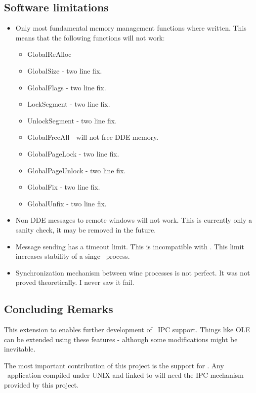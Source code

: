 \subsection{Software limitations}
\begin{itemize}
  \item Only most fundamental memory management functions where
    written. This means that the following functions will not work:
    \begin{itemize}
      \item GlobalReAlloc
      \item GlobalSize - two line fix.
      \item GlobalFlags - two line fix.
      \item LockSegment - two line fix.
      \item UnlockSegment - two line fix.
      \item GlobalFreeAll - will not free DDE memory.
      \item GlobalPageLock - two line fix.
      \item GlobalPageUnlock - two line fix.
      \item GlobalFix - two line fix.
      \item GlobalUnfix - two line fix.
    \end{itemize}
  \item Non DDE messages to remote windows will not work. This is
    currently only a sanity check, it may be removed in the future.
  \item Message sending has a timeout limit. This is incompatible with
    \windoz. This limit increases stability of a singe \Wine\ process.
  \item Synchronization mechanism between wine processes is not
    perfect. It was not proved theoretically. I never saw it fail.
\end{itemize}

\subsection{Concluding Remarks}
This extension to \Wine{} enables further development of \windoz\ IPC
support. Things like OLE can be extended using these features -
although some modifications might be inevitable.

The most important contribution of this project is the support for
\libwine{}. Any \windoz\ application compiled under UNIX and linked to
\libwine{} will need the IPC mechanism provided by this project.

